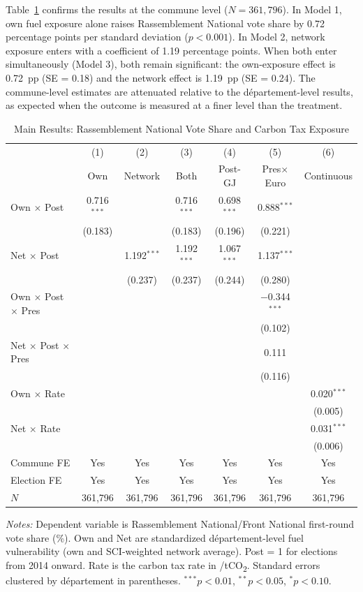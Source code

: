 \documentclass[12pt]{article}
\providecommand{\euro}{\texteuro}
\newcommand{\rn}{Rassemblement National}
\newcommand{\fn}{Front National}
\newcommand{\dept}{d\'{e}partement}
\begin{document}
Table~\ref{tab:main} confirms the results at the commune level ($N = 361{,}796$). In Model 1, own fuel exposure alone raises \rn{} vote share by 0.72 percentage points per standard deviation ($p < 0.001$). In Model 2, network exposure enters with a coefficient of 1.19 percentage points. When both enter simultaneously (Model 3), both remain significant: the own-exposure effect is 0.72~pp (SE = 0.18) and the network effect is 1.19~pp (SE = 0.24). The commune-level estimates are attenuated relative to the \dept{}-level results, as expected when the outcome is measured at a finer level than the treatment.

\begin{table}[H]
\centering
\caption{Main Results: \rn{} Vote Share and Carbon Tax Exposure}
\label{tab:main}
\begin{threeparttable}
\begin{tabular}{@{}lcccccc@{}}
\toprule
 & (1) & (2) & (3) & (4) & (5) & (6) \\
 & Own & Network & Both & Post-GJ & Pres$\times$Euro & Continuous \\
\midrule
Own $\times$ Post & 0.716$^{***}$ & & 0.716$^{***}$ & 0.698$^{***}$ & 0.888$^{***}$ & \\
 & (0.183) & & (0.183) & (0.196) & (0.221) & \\[3pt]
Net $\times$ Post & & 1.192$^{***}$ & 1.192$^{***}$ & 1.067$^{***}$ & 1.137$^{***}$ & \\
 & & (0.237) & (0.237) & (0.244) & (0.280) & \\[3pt]
Own $\times$ Post $\times$ Pres & & & & & $-$0.344$^{***}$ & \\
 & & & & & (0.102) & \\[3pt]
Net $\times$ Post $\times$ Pres & & & & & 0.111 & \\
 & & & & & (0.116) & \\[3pt]
Own $\times$ Rate & & & & & & 0.020$^{***}$ \\
 & & & & & & (0.005) \\[3pt]
Net $\times$ Rate & & & & & & 0.031$^{***}$ \\
 & & & & & & (0.006) \\[3pt]
\midrule
Commune FE & Yes & Yes & Yes & Yes & Yes & Yes \\
Election FE & Yes & Yes & Yes & Yes & Yes & Yes \\
$N$ & 361,796 & 361,796 & 361,796 & 361,796 & 361,796 & 361,796 \\
\bottomrule
\end{tabular}
\begin{tablenotes}
\small
\item \textit{Notes:} Dependent variable is \rn{}/\fn{} first-round vote share (\%). Own and Net are standardized \dept{}-level fuel vulnerability (own and SCI-weighted network average). Post = 1 for elections from 2014 onward. Rate is the carbon tax rate in \euro/tCO\textsubscript{2}. Standard errors clustered by \dept{} in parentheses. $^{***}p<0.01$, $^{**}p<0.05$, $^{*}p<0.10$.
\end{tablenotes}
\end{threeparttable}
\end{table}
\end{document}
